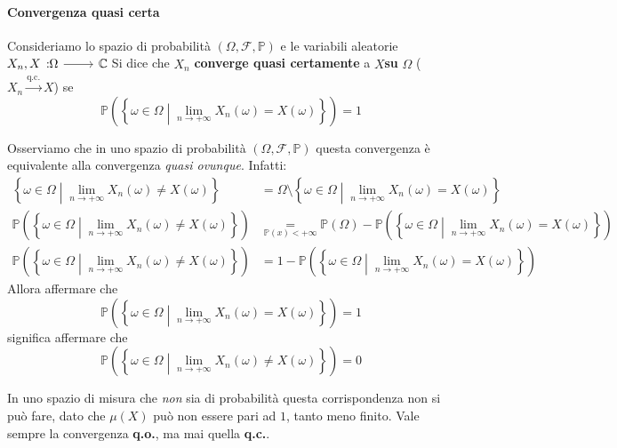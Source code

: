 \paragraph{Convergenza quasi certa}
\begin{define}
	Consideriamo lo spazio di probabilità $\left(\Omega,\mathcal{F},\mathbb{P}\right)$ e le variabili aleatorie $\funz{X_n,X}{\Omega}{\complexset}$
	Si dice che $X_n$ \textbf{converge quasi certamente} a $X$\textbf{su} $\Omega$ ($X_n\overset{\text{q.c.}}{\to} X$) se
	\begin{equation}
		\mathbb{P}\left(\left\{\omega\in\Omega\middle|\lim_{n\to+\infty}X_n\left(\omega\right)=X\left(\omega\right)\right\}\right)=1
	\end{equation}
\end{define}
Osserviamo che in uno spazio di probabilità $\left(\Omega,\mathcal{F},\mathbb{P}\right)$ questa convergenza è equivalente alla convergenza \textit{quasi ovunque}. Infatti:
\begin{align*}
	\left\{\omega\in \Omega\middle|\lim_{n\to+\infty}X_n\left(\omega\right)\neq X\left(\omega\right)\right\}&=\Omega\setminus\left\{\omega\in \Omega\middle|\lim_{n\to+\infty}X_n\left(\omega\right)= X\left(\omega\right)\right\}\\
	\mathbb{P}\left(\left\{\omega\in \Omega\middle|\lim_{n\to+\infty}X_n\left(\omega\right)\neq X\left(\omega\right)\right\}\right)&\underset{\mathbb{P}(x)<+\infty}{=}\mathbb{P}\left(\Omega\right)-\mathbb{P}\left(\left\{\omega\in \Omega\middle|\lim_{n\to+\infty}X_n\left(\omega\right)= X\left(\omega\right)\right\}\right)\\
	\mathbb{P}\left(\left\{\omega\in \Omega\middle|\lim_{n\to+\infty}X_n\left(\omega\right)\neq X\left(\omega\right)\right\}\right)&=1-\mathbb{P}\left(\left\{\omega\in \Omega\middle|\lim_{n\to+\infty}X_n\left(\omega\right)= X\left(\omega\right)\right\}\right)
\end{align*}
Allora affermare che
\begin{equation*}
	\mathbb{P}\left(\left\{\omega\in \Omega\middle|\lim_{n\to+\infty}X_n\left(\omega\right)= X\left(\omega\right)\right\}\right)=1
\end{equation*}
significa affermare che
\begin{equation*}
	\mathbb{P}\left(\left\{\omega\in \Omega\middle|\lim_{n\to+\infty}X_n\left(\omega\right)\neq X\left(\omega\right)\right\}\right)=0
\end{equation*}
\begin{attention}
	In uno spazio di misura che \textit{non} sia di probabilità questa corrispondenza non si può fare, dato che $\mu(X)$ può non essere pari ad $1$, tanto meno finito. Vale sempre la convergenza \textbf{q.o.}, ma mai quella \textbf{q.c.}.
\end{attention}
